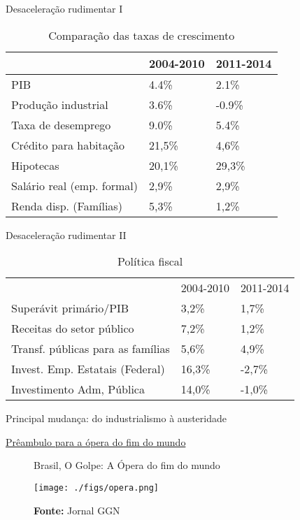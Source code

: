 \documentclass[presentation]{beamer}
\begin{document}
\begin{frame}[label={sec:orgd18a5eb}]{Desaceleração rudimentar I}
\begin{table}[htbp]
\caption{Comparação das taxas de crescimento}
\centering
\begin{tabular}{lll}
\hline
 & 2004-2010 & 2011-2014\\
\hline
PIB & 4.4\% & 2.1\%\\
Produção industrial & 3.6\% & -0.9\%\\
Taxa de desemprego & 9.0\% & 5.4\%\\
Crédito para habitação & 21,5\% & 4,6\%\\
Hipotecas & 20,1\% & 29,3\%\\
Salário real (emp. formal) & 2,9\% & 2,9\%\\
Renda disp. (Famílias) & 5,3\% & 1,2\%\\
\hline
\end{tabular}
\end{table}
\end{frame}


\begin{frame}[label={sec:org1162fb6}]{Desaceleração rudimentar II}
\begin{table}[htbp]
\caption{Política fiscal}
\centering
\begin{tabular}{lll}
\hline
 & 2004-2010 & 2011-2014\\
Superávit primário/PIB & 3,2\% & 1,7\%\\
Receitas do setor público & 7,2\% & 1,2\%\\
Transf. públicas para as famílias & 5,6\% & 4,9\%\\
Invest. Emp. Estatais (Federal) & 16,3\% & -2,7\%\\
Investimento Adm, Pública & 14,0\% & -1,0\%\\
\hline
\end{tabular}
\end{table}

\alert{Principal mudança:} do industrialismo à austeridade
\end{frame}

\begin{frame}[label={sec:orga5f6e3c}]{\href{https://www.causaoperaria.org.br/brasil-o-golpe-a-opera-do-fim-do-mundo-artista-retrata-o-golpe-de-estado-no-pais/}{Prêambulo para a ópera do fim do mundo}}
\begin{figure}[htb]
\centering
\caption{Brasil, O Golpe: A Ópera do fim do mundo} 
\texttt{[image: ./figs/opera.png]}
\caption*{\textbf{Fonte:} Jornal GGN}
\end{figure}
\end{frame}
\end{document}
